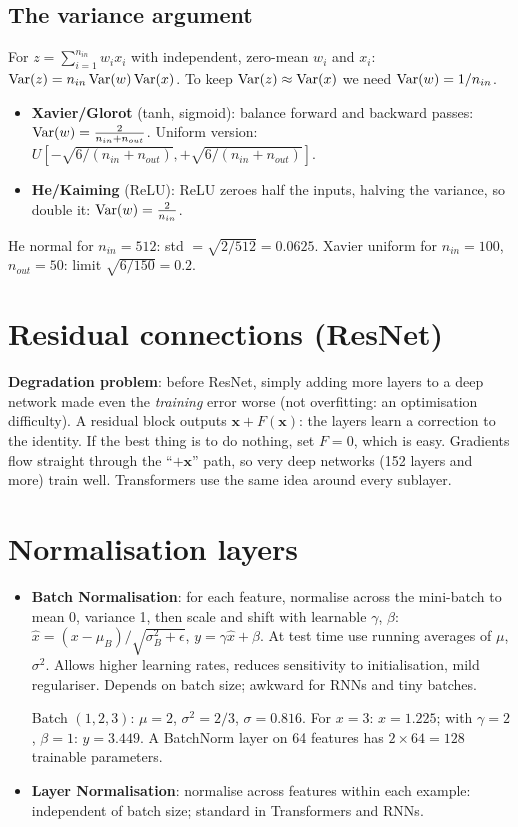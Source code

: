 \subsection{The variance argument}
For $z = \sum_{i=1}^{n_{in}}w_ix_i$ with independent, zero-mean $w_i$ and $x_i$: $\operatorname{Var}(z) = n_{in}\operatorname{Var}(w)\operatorname{Var}(x)$. To keep $\operatorname{Var}(z)\approx\operatorname{Var}(x)$ we need
$\operatorname{Var}(w) = 1/n_{in}$.
\begin{itemize}
\item \textbf{Xavier/Glorot} (tanh, sigmoid): balance forward and backward passes: $\operatorname{Var}(w) = \frac{2}{n_{in} + n_{out}}$. Uniform version:
  $U[-\sqrt{6/(n_{in}+n_{out})}, +\sqrt{6/(n_{in}+n_{out})}]$.
\item \textbf{He/Kaiming} (ReLU): ReLU zeroes half the inputs, halving the variance, so double it: $\operatorname{Var}(w) = \frac{2}{n_{in}}$.
\end{itemize}
\begin{example}
He normal for $n_{in} = 512$: std $= \sqrt{2/512} = 0.0625$. Xavier uniform for $n_{in} = 100$, $n_{out} = 50$: limit $\sqrt{6/150} = 0.2$.
\end{example}

\section{Residual connections (ResNet)}
\textbf{Degradation problem}: before ResNet, simply adding more layers to a deep network made even the \emph{training} error worse (not overfitting: an optimisation
difficulty). A residual block outputs $\mathbf x + F(\mathbf x)$: the layers learn a correction to the identity. If the best thing is to do nothing, set $F = 0$, which is easy.
Gradients flow straight through the ``$+\mathbf x$'' path, so very deep networks (152 layers and more) train well. Transformers use the same idea around every sublayer.

\section{Normalisation layers}
\begin{itemize}
\item \textbf{Batch Normalisation}: for each feature, normalise across the mini-batch to mean 0, variance 1, then scale and shift with learnable $\gamma$, $\beta$:
  $\hat x = (x - \mu_B)/\sqrt{\sigma_B^2 + \epsilon}$, $y = \gamma\hat x + \beta$. At test time use running averages of $\mu$, $\sigma^2$. Allows higher learning
  rates, reduces sensitivity to initialisation, mild regulariser. Depends on batch size; awkward for RNNs and tiny batches.
  \begin{example}
  Batch $(1, 2, 3)$: $\mu = 2$, $\sigma^2 = 2/3$, $\sigma = 0.816$. For $x = 3$: $\hat x = 1.225$; with $\gamma = 2$, $\beta = 1$: $y = 3.449$. A BatchNorm layer on 64
  features has $2\times64 = 128$ trainable parameters.
  \end{example}
\item \textbf{Layer Normalisation}: normalise across features within each example: independent of batch size; standard in Transformers and RNNs.
\end{itemize}

